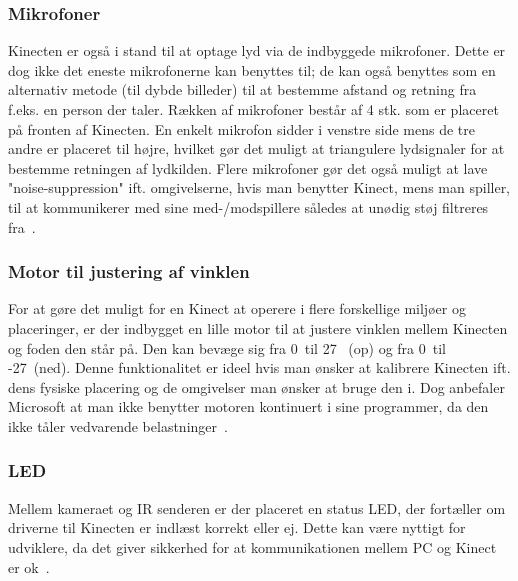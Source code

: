 \subsubsection{Mikrofoner}
Kinecten er også i stand til at optage lyd via de indbyggede mikrofoner.
Dette er dog ikke det eneste mikrofonerne kan benyttes til; de kan også benyttes som en alternativ metode (til dybde billeder) til at bestemme afstand og retning fra f.eks. en person der taler.
Rækken af mikrofoner består af 4 stk. som er placeret på fronten af Kinecten.
En enkelt mikrofon sidder i venstre side mens de tre andre er placeret til højre, hvilket gør det muligt at triangulere lydsignaler for at bestemme retningen af lydkilden.
Flere mikrofoner gør det også muligt at lave "noise-suppression" ift. omgivelserne, hvis man benytter Kinect, mens man spiller, til at kommunikerer med sine med-/modspillere således at unødig støj filtreres fra~\cite[s.~15]{kinectProgrammingGuide}.

\subsubsection{Motor til justering af vinklen}
For at gøre det muligt for en Kinect at operere i flere forskellige miljøer og placeringer, er der indbygget en lille motor til at justere vinklen mellem Kinecten og foden den står på.
Den kan bevæge sig fra 0\degree~til 27\degree~ (op) og fra 0\degree~til -27\degree~(ned).
Denne funktionalitet er ideel hvis man ønsker at kalibrere Kinecten ift. dens fysiske placering og de omgivelser man ønsker at bruge den i.
Dog anbefaler Microsoft at man ikke benytter motoren kontinuert i sine programmer, da den ikke tåler vedvarende belastninger~\cite{kinectDocElevationAngle}.

\subsubsection{LED}
Mellem kameraet og IR senderen er der placeret en status LED, der fortæller om driverne til Kinecten er indlæst korrekt eller ej.
Dette kan være nyttigt for udviklere, da det giver sikkerhed for at kommunikationen mellem PC og Kinect er ok~\cite[s.~15]{kinectProgrammingGuide}.

